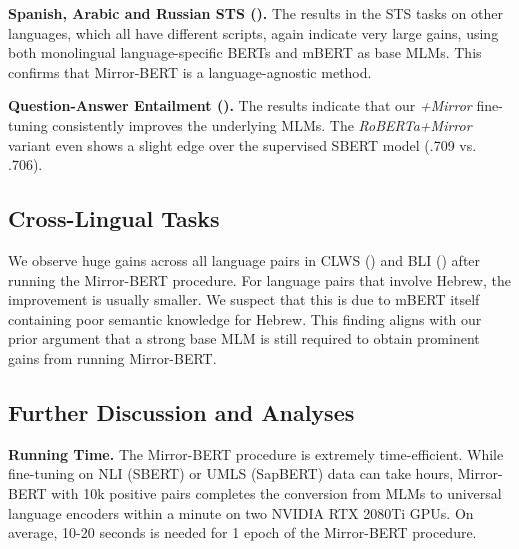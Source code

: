 \documentclass[11pt]{article}
\begin{document}
\vspace{1.5mm}
\noindent \textbf{Spanish, Arabic and Russian STS ().} The results in the STS tasks on other languages, which all have different scripts, again indicate very large gains, using both monolingual language-specific BERTs and mBERT as base MLMs. This confirms that Mirror-BERT is a language-agnostic method.

\vspace{1.5mm}
\noindent \textbf{Question-Answer Entailment ().} The results indicate that our \textit{+Mirror} fine-tuning consistently improves the underlying MLMs. The \textit{RoBERTa+Mirror} variant even shows a slight edge over the supervised SBERT model (.709 vs. .706).







\subsection{Cross-Lingual Tasks}\label{sec:xling}



We observe huge gains across all language pairs in CLWS () and BLI () after running the Mirror-BERT procedure. For language pairs that involve Hebrew, the improvement is usually smaller. We suspect that this is due to mBERT itself containing poor semantic knowledge for Hebrew. This finding aligns with our prior argument that a strong base MLM is still required to obtain prominent gains from running Mirror-BERT.  





\subsection{Further Discussion and Analyses}
\label{ss:further}

\noindent \textbf{Running Time.}
The Mirror-BERT procedure is extremely time-efficient. While fine-tuning on NLI (SBERT) or UMLS (SapBERT) data can take hours, Mirror-BERT with 10k positive pairs completes the conversion from MLMs to universal language encoders within a minute on two NVIDIA RTX 2080Ti GPUs. On average, 10-20 seconds is needed for 1 epoch of the Mirror-BERT procedure.
\end{document}
